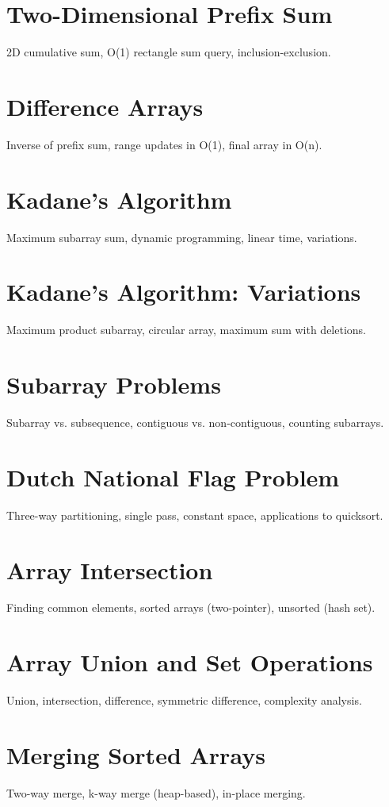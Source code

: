 \chapter{Two-Dimensional Prefix Sum}
2D cumulative sum, O(1) rectangle sum query, inclusion-exclusion.

\chapter{Difference Arrays}
Inverse of prefix sum, range updates in O(1), final array in O(n).

\chapter{Kadane's Algorithm}
Maximum subarray sum, dynamic programming, linear time, variations.

\chapter{Kadane's Algorithm: Variations}
Maximum product subarray, circular array, maximum sum with deletions.

\chapter{Subarray Problems}
Subarray vs. subsequence, contiguous vs. non-contiguous, counting subarrays.

\chapter{Dutch National Flag Problem}
Three-way partitioning, single pass, constant space, applications to quicksort.

\chapter{Array Intersection}
Finding common elements, sorted arrays (two-pointer), unsorted (hash set).

\chapter{Array Union and Set Operations}
Union, intersection, difference, symmetric difference, complexity analysis.

\chapter{Merging Sorted Arrays}
Two-way merge, k-way merge (heap-based), in-place merging.

